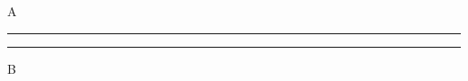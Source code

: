 \documentclass{article}
\def\myrule{\hrule}
\begin{document}
A\leaders\noexpand\myrule\hrule\hfill B
\end{document}
